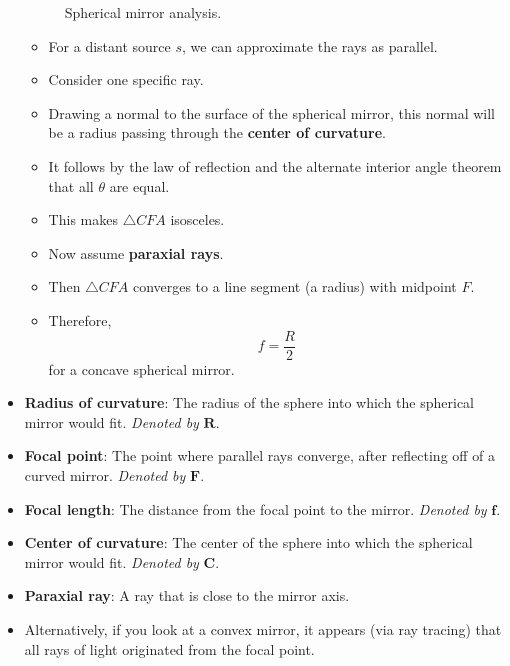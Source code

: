 \documentclass[../notes.tex]{subfiles}
\begin{document}
\begin{itemize}
\begin{figure}[h!]
        \caption{Spherical mirror analysis.}
        \label{fig:sphericalMirror}
    \end{figure}
    \begin{itemize}
        \item For a distant source $s$, we can approximate the rays as parallel.
        \item Consider one specific ray.
        \item Drawing a normal to the surface of the spherical mirror, this normal will be a radius passing through the \textbf{center of curvature}.
        \item It follows by the law of reflection and the alternate interior angle theorem that all $\theta$ are equal.
        \item This makes $\triangle CFA$ isosceles.
        \item Now assume \textbf{paraxial rays}.
        \item Then $\triangle CFA$ converges to a line segment (a radius) with midpoint $F$.
        \item Therefore,
        \begin{equation*}
            f = \frac{R}{2}
        \end{equation*}
        for a concave spherical mirror.
    \end{itemize}
    \item \textbf{Radius of curvature}: The radius of the sphere into which the spherical mirror would fit. \emph{Denoted by} $\bm{R}$.
    \item \textbf{Focal point}: The point where parallel rays converge, after reflecting off of a curved mirror. \emph{Denoted by} $\bm{F}$.
    \item \textbf{Focal length}: The distance from the focal point to the mirror. \emph{Denoted by} $\bm{f}$.
    \item \textbf{Center of curvature}: The center of the sphere into which the spherical mirror would fit. \emph{Denoted by} $\bm{C}$.
    \item \textbf{Paraxial ray}: A ray that is close to the mirror axis.
    \item Alternatively, if you look at a convex mirror, it appears (via ray tracing) that all rays of light originated from the focal point.

\end{itemize}
\end{document}
